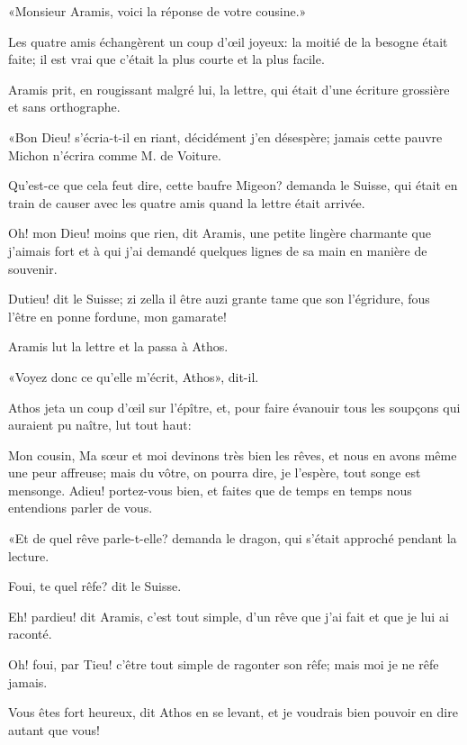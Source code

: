 «Monsieur Aramis, voici la réponse de votre cousine.» 

Les quatre amis échangèrent un coup d'œil joyeux: la moitié de la besogne était faite; il est vrai que c'était la plus courte et la plus facile. 

Aramis prit, en rougissant malgré lui, la lettre, qui était d'une écriture grossière et sans orthographe. 

«Bon Dieu! s'écria-t-il en riant, décidément j'en désespère; jamais cette pauvre Michon n'écrira comme M. de Voiture. 

\speak  Qu'est-ce que cela feut dire, cette baufre Migeon? demanda le Suisse, qui était en train de causer avec les quatre amis quand la lettre était arrivée. 

\speak  Oh! mon Dieu! moins que rien, dit Aramis, une petite lingère charmante que j'aimais fort et à qui j'ai demandé quelques lignes de sa main en manière de souvenir. 

\speak  Dutieu! dit le Suisse; zi zella il être auzi grante tame que son l'égridure, fous l'être en ponne fordune, mon gamarate! 

Aramis lut la lettre et la passa à Athos. 

«Voyez donc ce qu'elle m'écrit, Athos», dit-il. 

Athos jeta un coup d'œil sur l'épître, et, pour faire évanouir tous les soupçons qui auraient pu naître, lut tout haut: 

\begin{mail}{}{Mon cousin,} 
	Ma sœur et moi devinons très bien les rêves, et nous en avons même une peur affreuse; mais du vôtre, on pourra dire, je l'espère, tout songe est mensonge. Adieu! portez-vous bien, et faites que de temps en temps nous entendions parler de vous. 
	
\end{mail}

«Et de quel rêve parle-t-elle? demanda le dragon, qui s'était approché pendant la lecture. 

\speak  Foui, te quel rêfe? dit le Suisse. 

\speak  Eh! pardieu! dit Aramis, c'est tout simple, d'un rêve que j'ai fait et que je lui ai raconté. 

\speak  Oh! foui, par Tieu! c'être tout simple de ragonter son rêfe; mais moi je ne rêfe jamais. 

\speak  Vous êtes fort heureux, dit Athos en se levant, et je voudrais bien pouvoir en dire autant que vous! 

